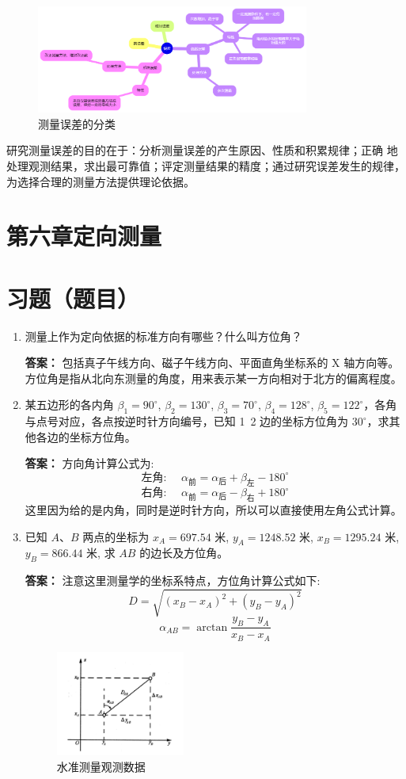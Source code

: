 \documentclass[12pt,a4paper]{article}
\newcounter{question}
\newenvironment{questions}{
    \setcounter{question}{0}
    \section*{习题（题目）}
    \begin{enumerate}[leftmargin=1.5em,label={\arabic*．}]
}{
    \end{enumerate}
}
\newcommand{\answer}[1]{\par\noindent\textbf{答案：} #1\par\vspace{1em}}
\begin{document}
\begin{figure}[H]
    \centering
    \includegraphics[width = 0.8\textwidth]{./figures/7.png}
    \caption{测量误差的分类}
\end{figure}

研究测量误差的目的在于：分析测量误差的产生原因、性质和积累规律；正确
地处理观测结果，求出最可靠值；评定测量结果的精度；通过研究误差发生的规律，
为选择合理的测量方法提供理论依据。 

\newpage

\section*{第六章\quad 定向测量}

\begin{questions}
    \item 测量上作为定向依据的标准方向有哪些？什么叫方位角？
    \answer{包括真子午线方向、磁子午线方向、平面直角坐标系的 X 轴方向等。方位角是指从北向东测量的角度，用来表示某一方向相对于北方的偏离程度。}
    \item 某五边形的各内角 $\beta_1=90^\circ$, $\beta_2=130^\circ$, $\beta_3=70^\circ$, $\beta_4=128^\circ$, $\beta_5=122^\circ$，各角与点号对应，各点按逆时针方向编号，已知 1~2 边的坐标方位角为 $30^\circ$，求其他各边的坐标方位角。
\answer{
方向角计算公式为:
\[
\text{左角: }\quad \alpha_{\text{前}} = \alpha_{\text{后}} + \beta_{\text{左}} - 180^\circ
\]
\[
\text{右角: }\quad \alpha_{\text{前}} = \alpha_{\text{后}} - \beta_{\text{右}} + 180^\circ
\]
这里因为给的是内角，同时是逆时针方向，所以可以直接使用左角公式计算。
}

\item 已知 \(A\)、\(B\) 两点的坐标为 \(x_A = 697.54\) 米, \(y_A = 1248.52\) 米, \(x_B = 1295.24\) 米, \(y_B = 866.44\) 米, 求 \(AB\) 的边长及方位角。

\answer{注意这里测量学的坐标系特点，方位角计算公式如下:
$$D = \sqrt{(x_B - x_A)^2 + (y_B - y_A)^2}
$$
$$\alpha_{AB} = \arctan \frac{y_B - y_A}{x_B - x_A}$$
\begin{figure}[H]
        \centering
        \includegraphics[width = 0.4\textwidth]{./figures/4.png}
        \caption{水准测量观测数据}
    \end{figure}
}
\end{questions}
\end{document}
